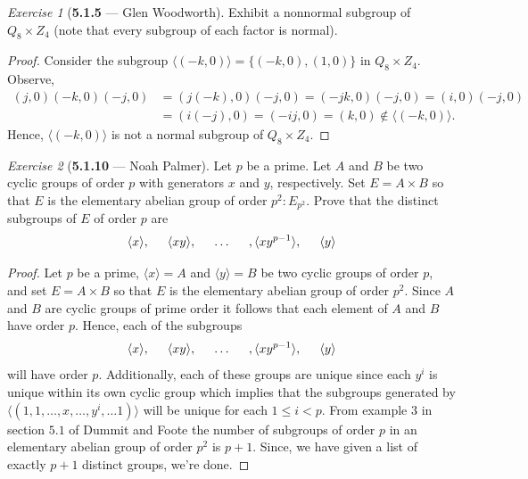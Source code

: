 \documentclass[12pt]{amsart}
\theoremstyle{remark}
\newtheorem*{exercise}{Exercise}%
\theoremstyle{mycomment}
\begin{document}
\begin{exercise}[\textbf{5.1.5} --- Glen Woodworth] Exhibit a nonnormal subgroup of $Q_8\times Z_4$ (note that every subgroup of each factor is normal).
  \begin{proof} Consider the subgroup $\langle (-k,0)\rangle=\{(-k,0),(1,0)\}$ in $Q_8\times Z_4$. Observe, \begin{align*}
  (j,0)(-k,0)(-j,0)&=(j(-k),0)(-j,0)=(-jk,0)(-j,0)=(i,0)(-j,0)\\
  &=(i(-j),0)=(-ij,0)=(k,0)\notin\langle (-k,0)\rangle.\end{align*}
 Hence, $\langle (-k,0)\rangle$ is not a normal subgroup of $Q_8\times Z_4$.
  \end{proof}
\end{exercise}
\vspace{.15in}

\begin{exercise}[\textbf{5.1.10} --- Noah Palmer] Let $p$ be a prime. Let $A$ and $B$ be two cyclic groups of order $p$ with generators $x$ and $y$, respectively. Set $E=A\times B$ so that $E$ is the elementary abelian group of order $p^2: E_{p^2}$. Prove that the distinct subgroups of $E$ of order $p$ are
  $$\langle x\rangle,\hspace{0.5cm}\langle xy\rangle,\hspace{0.5cm}\ldots \hspace{0.5cm},\langle xy^{p-1}\rangle,\hspace{0.5cm}\langle y\rangle$$
  \begin{proof}
  Let $p$ be a prime, $\langle x\rangle=A$ and $\langle y\rangle=B$ be two cyclic groups of order $p$, and set $E=A\times B$ so that $E$ is the elementary abelian group of order $p^2$. Since $A$ and $B$ are cyclic groups of prime order it follows that each element of $A$ and $B$ have order $p$. Hence, each of the subgroups
  $$\langle x\rangle,\hspace{0.5cm}\langle xy\rangle,\hspace{0.5cm}\ldots \hspace{0.5cm},\langle xy^{p-1}\rangle,\hspace{0.5cm}\langle y\rangle$$
  will have order $p$. Additionally, each of these groups are unique since each $y^{i}$ is unique within its own cyclic group which implies that the subgroups generated by $\langle(1,1,\ldots,x,\ldots, y^i,\ldots 1)\rangle$ will be unique for each $1\leq i<p$. From example $3$ in section $5.1$ of Dummit and Foote the number of subgroups of order $p$ in an elementary abelian group of order $p^2$ is $p+1$. Since, we have given a list of exactly $p+1$ distinct groups, we're done. 
  \end{proof}
  \end{exercise}
\vspace{.15in}
\end{document}
